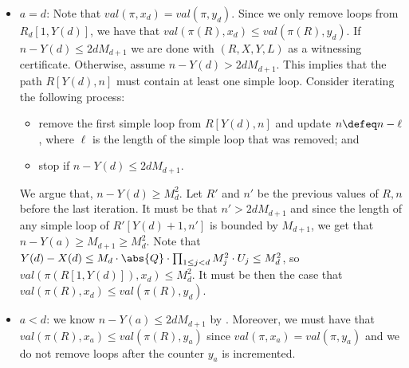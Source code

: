 \begin{itemize}
\item $a=d$: Note that $val(\pi,x_d)=val(\pi,y_d)$.  Since we only
  remove loops from $R_d[1,Y(d)]$, we have that $val(\pi(R),x_d)\le
  val(\pi(R),y_d)$. If $n-Y(d)\le 2dM_{d+1}$ we are done with $(R,X,Y,L)$ as
  a witnessing certificate.  Otherwise, assume $n-Y(d)>
  2dM_{d+1}$. This implies that the path $R[Y(d),n]$ must contain at
  least one simple loop. Consider iterating the following process:
\begin{itemize}
\item remove the first simple loop from $R[Y(d),n]$ and update
  $n\defeq n-\ell$, where $\ell$ is the length of the simple loop that
  was removed; and                 
\item stop if $n-Y(d)\le 2dM_{d+1}$.
\end{itemize}
We argue that, $n-Y(d)\ge M_d^2$. Let $R'$ and $n'$ 
be the previous values of $R,n$ before the last iteration. It must be that $n'
>2dM_{d+1}$ and since the length of 
any simple loop of $R'[Y(d)+1,n']$ is bounded by 
$M_{d+1}$, we get that $n-Y(a)\ge M_{d+1}\ge M_d^2$. 
Note that $Y(d)-X(d)\le M_d\cdot \abs{Q}\cdot\prod_{1\le j< d}M_j^2\cdot U_j\le M_d^2$, 
so $val(\pi(R[1,Y(d)]),x_d)\le M_d^2$. It must be then 
the case that $val(\pi(R),x_d)\le val(\pi(R),y_d)$.

\item $a<d$: we know $n-Y(a)\le 2dM_{d+1}$ by . Moreover, we must have that $val(\pi(R),x_a)\le val(\pi(R),y_a)$ since $val(\pi,x_a)=val(\pi,y_a)$ and we do not remove loops after the counter $y_a$ is incremented. 

\end{itemize}
